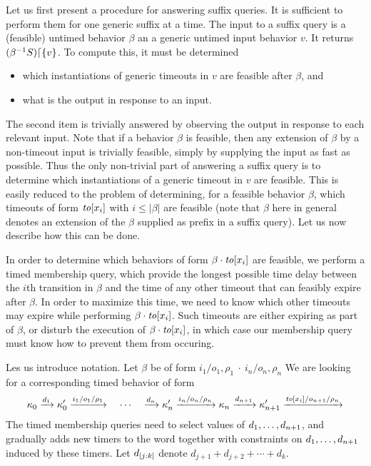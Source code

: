 Let us first present a procedure for answering suffix queries. It is
sufficient to perform them for one generic suffix at a time.
The input to a suffix query is a (feasible) untimed behavior $\beta$ an a
generic untimed input behavior $v$. It returns
$({\beta}^{-1}{S})\lceil{\lbrace v\rbrace}$. To compute this, it must be determined
\begin{itemize}
\item which instantiations of generic timeouts in $v$ are feasible after $\beta$, and
\item what is the output in response to an input.
\end{itemize}
The second item is trivially answered by observing the output in response to
each relevant input. Note that if a behavior $\beta$ is feasible, then
any extension of $\beta$ by a non-timeout input is trivially feasible, simply
by supplying the input as fast as possible. Thus the only non-trivial part
of answering a suffix query is to determine which instantiations of a generic
timeout in $v$ are feasible. This is easily reduced to the problem of
determining, for a feasible behavior $\beta$, which timeouts of form
$\mathit{to}[x_i]$ with $i \leq |\beta|$ are feasible (note that $\beta$ here in
general denotes an extension of the $\beta$ supplied as prefix in a
suffix query). Let us now describe how this can be done.

In order to determine which behaviors of form $\beta \cdot \mathit{to}[x_i]$
are feasible, we perform a timed membership query, which provide the longest
possible time delay between the $i$th transition in $\beta$ and the time
of any other timeout that can feasibly expire after $\beta$. In order to
maximize this time, we need to know which other timeouts may expire while
performing $\beta \cdot \mathit{to}[x_i]$. Such timeouts are either expiring
as part of $\beta$, or disturb the execution of $\beta \cdot \mathit{to}[x_i]$,
in which case our membership query must know how to prevent them from occuring.

Les us introduce notation. Let $\beta$ be of form
\(
  {i_1/o_1, \rho_1} \ \cdot \ {i_n/o_n, \rho_n}
\)
We are looking for a corresponding timed behavior of form 
\[
\kappa_0 \xrightarrow{d_1} \kappa'_0 \xrightarrow{i_1/o_1/\rho_1}
\quad \cdots \quad
\xrightarrow{d_n} \kappa'_n \xrightarrow{i_n/o_n/\rho_n} \kappa_n
\xrightarrow{d_{n+1}} \kappa'_{n+1} \xrightarrow{\mathit{to}[x_i]/o_{n+1}/\rho_n}
\]
The timed membership queries need to select values
of ${d}_1 , \ldots , {d}_{n+1}$, and gradually adds new timers to the word together
with constraints on ${d}_1 , \ldots , {d}_{n+1}$ induced by these timers.
Let $d_{[j:k]}$ denote $d_{j+1} + d_{j+2} + \cdots + d_k$.

